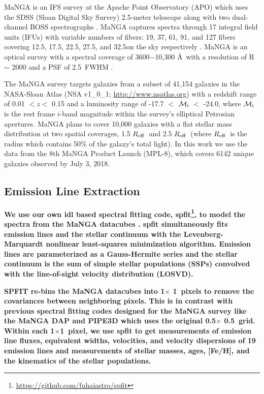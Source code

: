 \documentclass[iop,revtex4,twocolumn,apj,numberedappendix,appendixfloats]{emulateapj}
\newcommand{\reff}{$R_{\rm eff}$}
\begin{document}
MaNGA is an IFS survey at the Apache Point Observatory (APO) which uses the SDSS (Sloan Digital Sky Survey) 2.5-meter telescope along with two dual-channel BOSS spectrographs \citep{Drory:2015}. MaNGA captures spectra through 17 integral field units (IFUs) with variable numbers of fibers: 19, 37, 61, 91, and 127 fibers covering 12.5\arcsec, 17.5\arcsec, 22.5\arcsec, 27.5\arcsec, and 32.5\arcsec on the sky respectively \citep{Law:2015}. MaNGA is an optical survey with a spectral coverage of 3600$-$10,300 \AA\ with a resolution of R $\sim$ 2000 and a PSF of 2.5\arcsec\ FWHM \citep{Bundy:2015}. 

The MaNGA survey targets galaxies from a subset of 41,154 galaxies in the NASA-Sloan Atlas (NSA v1\_0\_1; \url{http://www.nsatlas.org}) with a redshift range of 0.01 $< z <$ 0.15 and a luminosity range of -17.7 $<$ $\mathcal{M}_{\rm i}$ $<$ -24.0, where $\mathcal{M}_{\rm i}$ is the rest frame $i$-band magnitude within the survey's elliptical Petrosian apertures. MaNGA plans to cover 10,000 galaxies with a flat stellar mass distribution at two spatial coverages, 1.5 \reff\ and 2.5 \reff\ (where \reff\ is the radius which contains 50\% of the galaxy's total light). In this work we use the data from the 8th MaNGA Product Launch (MPL-8), which covers 6142 unique galaxies observed by July 3, 2018. 

\subsection{\textbf{Emission Line Extraction}}\label{sec:spfit}

\textbf{
We use our own {\sc idl} based spectral fitting code, {\sc spfit}\footnote{\url{https://github.com/fuhaiastro/spfit}}, to model the spectra from the MaNGA datacubes . {\sc spfit} simultaneously fits emission lines and the stellar continuum with the Levenberg-Marquardt nonlinear least-squares minimization algorithm. Emission lines are parameterized as a Gauss-Hermite series and the stellar continuum is the sum of simple stellar populations (SSPs) convolved with the line-of-sight velocity distribution (LOSVD). 
}

\textbf{
{\sc SPFIT} re-bins the MaNGA datacubes into 1\arcsec $\times$ 1\arcsec\ pixels to remove the covariances between neighboring pixels. This is in contrast with previous spectral fitting codes designed for the MaNGA survey like the MaNGA {\sc DAP} \citep{Belfiore:2019} and {\sc PIPE3D} \citep{Sanchez:2016a, Sanchez:2016b} which uses the original 0.5\arcsec $\times$ 0.5\arcsec\ grid. Within each 1\arcsec$\times$1\arcsec\ pixel, we use {\sc spfit} to get measurements of emission line fluxes, equivalent widths, velocities, and velocity dispersions of 19 emission lines and measurements of stellar masses, ages, [Fe/H], and the kinematics of the stellar populations.
}
\end{document}

